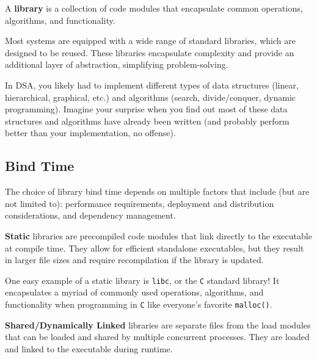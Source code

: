 \documentclass{report}
\begin{document}
\begin{tcolorbox}[title=Definition: Library]
  A \textbf{library} is a collection of code modules that encapsulate common operations, algorithms,
  and functionality. 
\end{tcolorbox}

\begin{tcolorbox}[colback=violet!5!white,colframe=violet,title=Abstraction: Libraries] 
  Most systems are equipped with a wide range of standard libraries, which are designed to be
  reused. These libraries encapsulate complexity and provide an additional layer of abstraction,
  simplifying problem-solving. 
\end{tcolorbox}

\begin{tcolorbox}[colback=blue!5!white,colframe=black!75!blue,title=Example: DSA Doozy] 
  In DSA, you likely had to implement different types of data structures (linear, hierarchical,
  graphical, etc.) and algorithms (search, divide/conquer, dynamic programming). Imagine your
  surprise when you find out most of these data structures and algorithms have already been written
  (and probably perform better than your implementation, no offense).
\end{tcolorbox}


\subsection{Bind Time}
The choice of library bind time depends on multiple factors that include (but are not limited to):
performance requirements, deployment and distribution considerations, and dependency
management.

\begin{tcolorbox}[title=Definition: Static]
  \textbf{Static} libraries are precompiled code modules that link directly to the executable at
  compile time. They allow for efficient standalone executables, but they result in larger file
  sizes and require recompilation if the library is updated.  
\end{tcolorbox}
One easy example of a static library is \texttt{libc}, or the \texttt{C} standard library! It
encapsulates a myriad of commonly used operations, algorithms, and functionality when programming in
\texttt{C} like everyone's favorite \texttt{malloc()}. 

\begin{tcolorbox}[title=Definition: Shared/Dynamic]
  \textbf{Shared/Dynamically Linked} libraries are separate files from the load modules that can
  be loaded and shared by multiple concurrent processes. They are loaded and linked to the
  executable during runtime. 
\end{tcolorbox}
\end{document}
